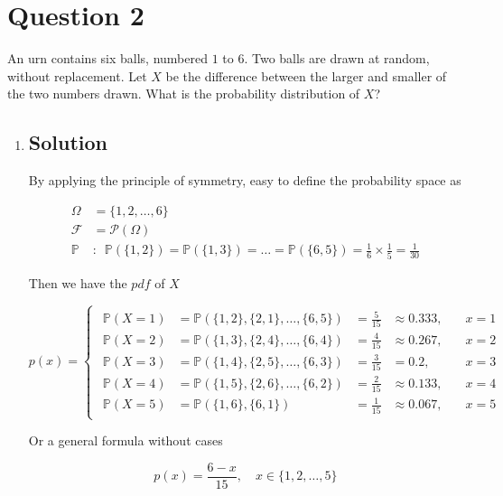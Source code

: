\documentclass[12pt]{article}
\newcommand{\bP}{\mathbb{P}}
\begin{document}
	
	\section*{Question 2}
	
	\noindent An urn contains six balls, numbered $1$ to $6$. Two balls are drawn at random, without replacement. Let $X$ be the difference between the larger and smaller of the two numbers drawn. What is the probability distribution of $X$?
	
	\bigskip
	
	\begin{enumerate}[label={},leftmargin=0in]\item
		\subsection*{Solution}
		
			By applying the principle of symmetry, easy to define the probability space as
			
			\[
			\begin{aligned}
				\Omega &= \{1,2,\dots,6\}\\
				\mathcal{F} &= \mathcal{P}(\Omega)\\
				\bP &:\enspace \bP(\{1,2\}) = \bP(\{1,3\}) = \dots = \bP(\{6,5\}) = \frac{1}{6}\times \frac{1}{5} = \frac{1}{30}
			\end{aligned}
			\]
			
			Then we have the $pdf$ of $X$
			
			\[
				p(x) =
				\begin{cases}
					\begin{aligned}
						\bP(X = 1) &= \bP(\{1,2\},\{2,1\},\dots,\{6,5\}) &= \frac{5}{15} &\approx 0.333,&\quad x = 1\\
						\bP(X = 2) &= \bP(\{1,3\},\{2,4\},\dots,\{6,4\}) &= \frac{4}{15} &\approx 0.267,&\quad x = 2\\
						\bP(X = 3) &= \bP(\{1,4\},\{2,5\},\dots,\{6,3\}) &= \frac{3}{15} &= 0.2,&\quad x = 3\\
						\bP(X = 4) &= \bP(\{1,5\},\{2,6\},\dots,\{6,2\}) &= \frac{2}{15} &\approx 0.133,&\quad x = 4\\
						\bP(X = 5) &= \bP(\{1,6\},\{6,1\}) &= \frac{1}{15} &\approx 0.067,&\quad x = 5
					\end{aligned}
				\end{cases}
			\]
			
			Or a general formula without cases
			
			\[p(x) = \frac{6-x}{15},\quad x\in\{1,2,\dots,5\}\]
		

\end{enumerate}
\end{document}
